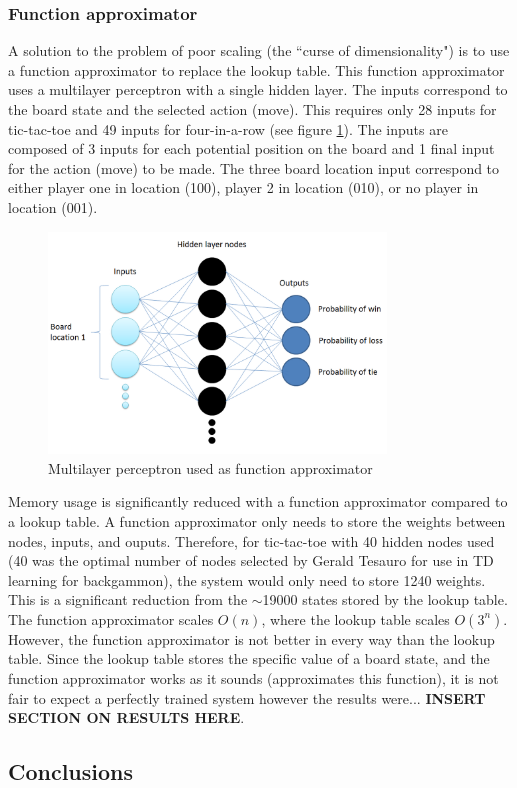 \documentclass[12pt,a4paper]{article}
\begin{document}
\subsubsection*{Function approximator}
A solution to the problem of poor scaling (the ``curse of dimensionality") is to use a function approximator to replace the lookup table. This function approximator uses a multilayer perceptron with a single hidden layer. The inputs correspond to the board state and the selected action (move). This requires only 28 inputs for tic-tac-toe and 49 inputs for four-in-a-row (see figure \ref{fig:funcApproxFigure}). The inputs are composed of 3 inputs for each potential position on the board and 1 final input for the action (move) to be made. The three board location input correspond to either player one in location (100), player 2 in location (010), or no player in location (001).
\begin{figure}[h]
\centering
\includegraphics[width=0.8\textwidth]{Figures/functionApproxFigure.png}
\caption{Multilayer perceptron used as function approximator}
\label{fig:funcApproxFigure}
\end{figure}
Memory usage is significantly reduced with a function approximator compared to a lookup table. A function approximator only needs to store the weights between nodes, inputs, and ouputs. Therefore, for tic-tac-toe with 40 hidden nodes used (40 was the optimal number of nodes selected by Gerald Tesauro for use in TD learning for backgammon), the system would only need to store 1240 weights. This is a significant reduction from the $\sim$19000 states stored by the lookup table. The function approximator scales $O(n)$, where the lookup table scales $O(3^{n})$. However, the function approximator is not better in every way than the lookup table. Since the lookup table stores the specific value of a board state, and the function approximator works as it sounds (approximates this function), it is not fair to expect a perfectly trained system however the results were... \textbf{INSERT SECTION ON RESULTS HERE}.
\pagebreak
\subsection*{Conclusions}
\end{document}
